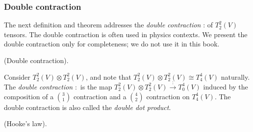 \subsubsection{Double contraction}

The next definition and theorem addresses the \textit{double contraction} : of $T^2_2(V)$ tensors. The double contraction is often used in physics contexts. We present the double contraction only for completeness; we do not use it in this book.

\begin{defn}
    (Double contraction).
    
    Consider $T^2_2(V) \otimes T^2_2(V)$, and note that $T^2_2(V) \otimes T^2_2(V) \cong T^4_4(V)$ naturally. The \textit{double contraction} $:$ is the map $T^2_2(V) \otimes T^2_2(V) \overset{:}{\rightarrow} T^4_0(V)$ induced by the composition of a $\binom{3}{1}$ contraction and a $\binom{4}{2}$ contraction on $T^4_4(V)$. The double contraction is also called the \textit{double dot product}.
\end{defn}

\begin{example}
    (Hooke's law).
\end{example}